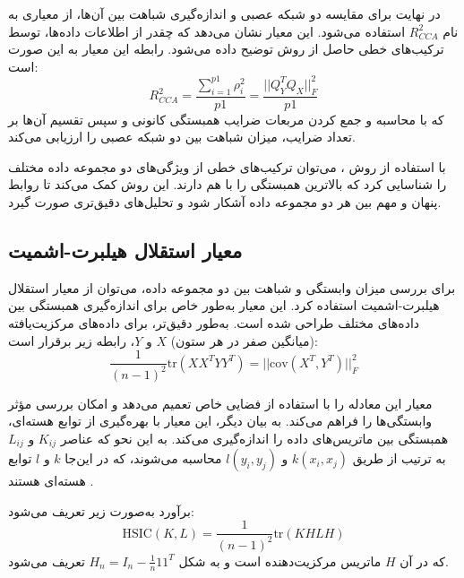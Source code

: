  در نهایت برای مقایسه دو شبکه عصبی و اندازه‌گیری شباهت بین آن‌ها، از معیاری به نام \( R^2_{CCA} \) استفاده می‌شود. این معیار نشان می‌دهد که چقدر از اطلاعات داده‌ها، توسط ترکیب‌های خطی حاصل از روش
 توضیح داده می‌شود. رابطه این معیار به این صورت است:
 \begin{equation}
 	R^2_{CCA} = \frac{\sum_{i=1}^{p1} \rho^2_i}{p1} = \frac{||Q^T_Y Q_X||^2_F}{p1}
 	\label{eq_CCA}
 \end{equation}
 که با محاسبه و جمع کردن مربعات ضرایب همبستگی کانونی و سپس تقسیم آن‌ها بر تعداد ضرایب، میزان شباهت بین دو شبکه عصبی را ارزیابی می‌کند.
 
 با استفاده از روش
 ، می‌توان ترکیب‌های خطی از ویژگی‌های دو مجموعه داده مختلف را شناسایی کرد که بالاترین همبستگی را با هم دارند. این روش کمک می‌کند تا روابط پنهان و مهم بین هر دو مجموعه داده آشکار شود و تحلیل‌های دقیق‌تری صورت گیرد.
 
 
 
 
 
 
 
 \subsection{
 	معیار استقلال هیلبرت-اشمیت%
 }
 برای بررسی میزان وابستگی و شباهت بین دو مجموعه داده، می‌توان از معیار استقلال هیلبرت-اشمیت استفاده کرد. این معیار به‌طور خاص برای اندازه‌گیری همبستگی بین داده‌های مختلف طراحی شده است. به‌طور دقیق‌تر، برای داده‌های مرکزیت‌یافته (میانگین صفر در هر ستون) \(X\) و \(Y\)، رابطه زیر برقرار است:
 \begin{equation}
 	\frac{1}{(n - 1)^2} \text{tr}(XX^TYY^T) = ||\text{cov}(X^T, Y^T)||_F^2
 \end{equation}
 
 معیار
 این معادله را با استفاده از فضایی خاص تعمیم می‌دهد و امکان بررسی مؤثر وابستگی‌ها را فراهم می‌کند. به بیان دیگر، این معیار با بهره‌گیری از توابع هسته‌ای، همبستگی بین ماتریس‌های داده را اندازه‌گیری می‌کند. به این نحو که عناصر \(K_{ij}\) و \(L_{ij}\) به ترتیب از طریق \(k(x_i, x_j)\) و \(l(y_i, y_j)\) محاسبه می‌شوند، که در این‌جا \(k\) و \(l\) توابع هسته‌ای هستند
 \cite{gretton2005measuring}.
 
 برآورد
 به‌صورت زیر تعریف می‌شود:
 \begin{equation}
 	\text{HSIC}(K, L) = \frac{1}{(n - 1)^2} \text{tr}(KHLH)
 	\label{eq_HSIC}
 \end{equation}
 که در آن
 \(H\)
 ماتریس مرکزیت‌دهنده است و به شکل \(H_n = I_n - \frac{1}{n} 11^T\) تعریف می‌شود.
 
